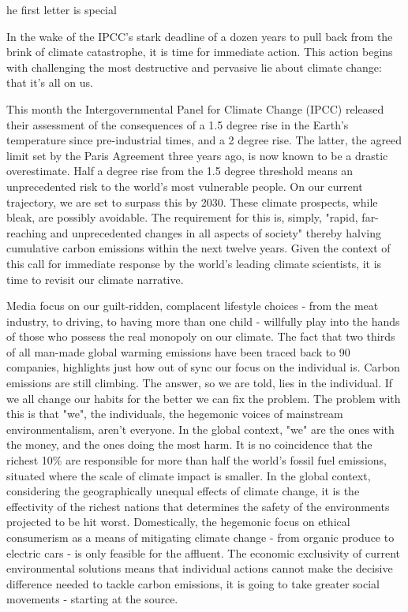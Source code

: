 \label{ch:the-most-powerful-climate-lie}

he first letter is special


In the wake of the IPCC's stark deadline of a dozen years to pull back from
the brink of climate catastrophe, it is time for immediate action. This
action begins with challenging the most destructive and pervasive lie about
climate change: that it's all on us.

   This month the Intergovernmental Panel for Climate Change (IPCC)
   released their assessment of the consequences of a 1.5 degree rise in
   the Earth's temperature since pre-industrial times, and a 2 degree
   rise. The latter, the agreed limit set by the Paris Agreement three
   years ago, is now known to be a drastic overestimate. Half a degree
   rise from the 1.5 degree threshold means an unprecedented risk to the
   world's most vulnerable people. On our current trajectory, we are set
   to surpass this by 2030. These climate prospects, while bleak, are
   possibly avoidable. The requirement for this is, simply, "rapid,
   far-reaching and unprecedented changes in all aspects of society"
   thereby halving cumulative carbon emissions within the next twelve
   years. Given the context of this call for immediate response by the
   world's leading climate scientists, it is time to revisit our climate
   narrative.

   Media focus on our guilt-ridden, complacent lifestyle choices - from
   the meat industry, to driving, to having more than one child -
   willfully play into the hands of those who possess the real monopoly on
   our climate. The fact that two thirds of all man-made global warming
   emissions have been traced back to 90 companies, highlights just how
   out of sync our focus on the individual is. Carbon emissions are still
   climbing. The answer, so we are told, lies in the individual. If we all
   change our habits for the better we can fix the problem. The problem
   with this is that "we", the individuals, the hegemonic voices of
   mainstream environmentalism, aren't everyone. In the global context,
   "we" are the ones with the money, and the ones doing the most harm. It
   is no coincidence that the richest 10\% are responsible for more than
   half the world's fossil fuel emissions, situated where the scale of
   climate impact is smaller. In the global context, considering the
   geographically unequal effects of climate change, it is the effectivity
   of the richest nations that determines the safety of the environments
   projected to be hit worst. Domestically, the hegemonic focus on ethical
   consumerism as a means of mitigating climate change - from organic
   produce to electric cars - is only feasible for the affluent. The
   economic exclusivity of current environmental solutions means that
   individual actions cannot make the decisive difference needed to tackle
   carbon emissions, it is going to take greater social movements -
   starting at the source.

